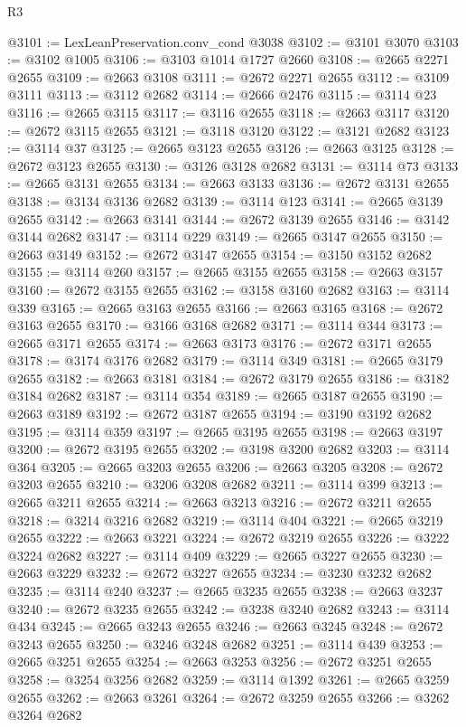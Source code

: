 \begin{lexlean}{R3}
\begin{coremodule}
@3101 := LexLeanPreservation.conv_cond @3038
@3102 := @3101 @3070
@3103 := @3102 @1005
@3106 := @3103 @1014 @1727 @2660
@3108 := @2665 @2271 @2655
@3109 := @2663 @3108
@3111 := @2672 @2271 @2655
@3112 := @3109 @3111
@3113 := @3112 @2682
@3114 := @2666 @2476
@3115 := @3114 @23
@3116 := @2665 @3115
@3117 := @3116 @2655
@3118 := @2663 @3117
@3120 := @2672 @3115 @2655
@3121 := @3118 @3120
@3122 := @3121 @2682
@3123 := @3114 @37
@3125 := @2665 @3123 @2655
@3126 := @2663 @3125
@3128 := @2672 @3123 @2655
@3130 := @3126 @3128 @2682
@3131 := @3114 @73
@3133 := @2665 @3131 @2655
@3134 := @2663 @3133
@3136 := @2672 @3131 @2655
@3138 := @3134 @3136 @2682
@3139 := @3114 @123
@3141 := @2665 @3139 @2655
@3142 := @2663 @3141
@3144 := @2672 @3139 @2655
@3146 := @3142 @3144 @2682
@3147 := @3114 @229
@3149 := @2665 @3147 @2655
@3150 := @2663 @3149
@3152 := @2672 @3147 @2655
@3154 := @3150 @3152 @2682
@3155 := @3114 @260
@3157 := @2665 @3155 @2655
@3158 := @2663 @3157
@3160 := @2672 @3155 @2655
@3162 := @3158 @3160 @2682
@3163 := @3114 @339
@3165 := @2665 @3163 @2655
@3166 := @2663 @3165
@3168 := @2672 @3163 @2655
@3170 := @3166 @3168 @2682
@3171 := @3114 @344
@3173 := @2665 @3171 @2655
@3174 := @2663 @3173
@3176 := @2672 @3171 @2655
@3178 := @3174 @3176 @2682
@3179 := @3114 @349
@3181 := @2665 @3179 @2655
@3182 := @2663 @3181
@3184 := @2672 @3179 @2655
@3186 := @3182 @3184 @2682
@3187 := @3114 @354
@3189 := @2665 @3187 @2655
@3190 := @2663 @3189
@3192 := @2672 @3187 @2655
@3194 := @3190 @3192 @2682
@3195 := @3114 @359
@3197 := @2665 @3195 @2655
@3198 := @2663 @3197
@3200 := @2672 @3195 @2655
@3202 := @3198 @3200 @2682
@3203 := @3114 @364
@3205 := @2665 @3203 @2655
@3206 := @2663 @3205
@3208 := @2672 @3203 @2655
@3210 := @3206 @3208 @2682
@3211 := @3114 @399
@3213 := @2665 @3211 @2655
@3214 := @2663 @3213
@3216 := @2672 @3211 @2655
@3218 := @3214 @3216 @2682
@3219 := @3114 @404
@3221 := @2665 @3219 @2655
@3222 := @2663 @3221
@3224 := @2672 @3219 @2655
@3226 := @3222 @3224 @2682
@3227 := @3114 @409
@3229 := @2665 @3227 @2655
@3230 := @2663 @3229
@3232 := @2672 @3227 @2655
@3234 := @3230 @3232 @2682
@3235 := @3114 @240
@3237 := @2665 @3235 @2655
@3238 := @2663 @3237
@3240 := @2672 @3235 @2655
@3242 := @3238 @3240 @2682
@3243 := @3114 @434
@3245 := @2665 @3243 @2655
@3246 := @2663 @3245
@3248 := @2672 @3243 @2655
@3250 := @3246 @3248 @2682
@3251 := @3114 @439
@3253 := @2665 @3251 @2655
@3254 := @2663 @3253
@3256 := @2672 @3251 @2655
@3258 := @3254 @3256 @2682
@3259 := @3114 @1392
@3261 := @2665 @3259 @2655
@3262 := @2663 @3261
@3264 := @2672 @3259 @2655
@3266 := @3262 @3264 @2682

\end{coremodule}
\end{lexlean}
